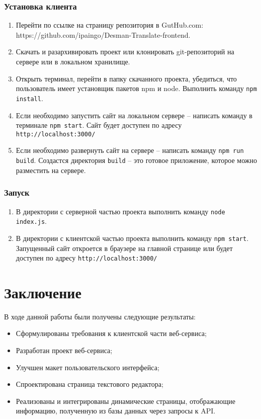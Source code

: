 \documentclass[a4paper,12pt]{article}
\begin{document}
\subsubsection{Установка клиента}
\begin{enumerate}
\item Перейти по ссылке на страницу репозитория в GutHub.com: https://github.com/ipaingo/Desman-Translate-frontend.
\item Скачать и разархивировать проект или клонировать git-репозиторий на сервере или в локальном хранилище.
\item Открыть терминал, перейти в папку скачанного проекта, убедиться, что пользователь имеет установщик пакетов npm и node. Выполнить команду \verb|npm install|.
\item Если необходимо запустить сайт на локальном сервере – написать команду в терминале \verb|npm start|. Сайт будет доступен по адресу \verb|http://localhost:3000/|
\item Если необходимо развернуть сайт на сервере – написать команду \verb|npm run build|. Создастся директория \verb|build| – это готовое приложение, которое можно разместить на сервере.
\end{enumerate}

\subsubsection{Запуск}
\begin{enumerate}
\item В директории с серверной частью проекта выполнить команду \verb|node index.js|.
\item В директории с клиентской частью проекта выполнить команду \verb|npm start|. Запущенный сайт откроется в браузере на главной странице или будет доступен по адресу \verb|http://localhost:3000/|
\end{enumerate}




\newpage
\section*{Заключение}

В ходе данной работы были получены следующие результаты:
\begin{itemize}
	\item Сформулированы требования к клиентской части веб-сервиса;
 	\item Разработан проект веб-сервиса;
	\item Улучшен макет пользовательского интерфейса;
 	\item Спроектирована страница текстового редактора;
  	\item Реализованы и интегрированы динамические страницы, отображающие информацию, полученную из базы данных через запросы к API.
\end{itemize}
\end{document}
